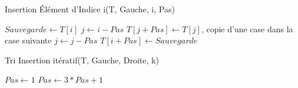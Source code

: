 \documentclass{article}
\begin{document}
\begin{algorithm}
  \begin{algorithmic}[K]
    \caption{Insertion Élément d'Indice i(T, Gauche, i, Pas)}
    \State $Sauvegarde \gets T[i]$
    \State $j \gets i - Pas$
      \State $T[j+Pas] \gets T[j]$, copie d'une case dans la case suivante
      \State $j \gets j - Pas$
    \EndWhile
    \State $T[i+Pas] \gets Sauvegarde$
  \end{algorithmic}
\end{algorithm}

\begin{algorithm}
  \begin{algorithmic}[2]
    \caption{Tri Insertion itératif(T, Gauche, Droite, k)}
      \State $Pas \gets 1$
        \State $Pas \gets 3 * Pas + 1$
        \State {}
      \EndFor
    \EndFor
  \end{algorithmic}
\end{algorithm}
 
\end{document}

